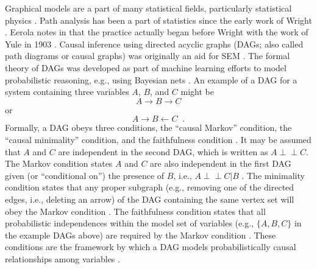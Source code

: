 \documentclass{article}[10pt]
\def\ci{\perp\!\!\!\perp}
\begin{document}
Graphical models are a part of many statistical fields, particularly statistical physics \cite{Lauritzen1996}.  Path analysis has been a part of statistics since the early work of Wright \cite{Wright1934}.  Eerola notes in \cite{Eerola2012} that the practice actually began before Wright with the work of Yule in 1903 \cite{Yule1903}.  Causal inference using directed acyclic graphs (DAGs; also called path diagrams or causal graphs) was originally an aid for SEM \cite{Greenland2002}.  The formal theory of DAGs was developed as part of machine learning efforts to model probabilistic reasoning, e.g., using Bayesian nets \cite{Spirtes2000}.  An example of a DAG for a system containing three variables $A$, $B$, and $C$ might be
\begin{equation}
A \rightarrow B \rightarrow C
\end{equation}
or
\begin{equation}
A \rightarrow B \leftarrow C\;\;.
\end{equation}
Formally, a DAG obeys three conditions, the ``causal Markov'' condition, the ``causal minimality'' condition, and the faithfulness condition \cite{Spirtes2000,Pearl2000}.  It may be assumed that $A$ and $C$ are independent in the second DAG, which is written as $A\ci C$.  The Markov condition states $A$ and $C$ are also independent in the first DAG given (or ``conditional on'') the presence of $B$, i.e., $A\ci C|B$ \cite{Spirtes2000}.  The minimality condition states that any proper subgraph (e.g., removing one of the directed edges, i.e., deleting an arrow) of the DAG containing the same vertex set will obey the Markov condition \cite{Spirtes2000,Hitchcock2012}.  The faithfulness condition states that all probabilistic independences within the model set of variables (e.g., $\{A,B,C\}$ in the example DAGs above) are required by the Markov condition \cite{Spirtes2000,Pearl2000,Hitchcock2012}.  These conditions are the framework by which a DAG models probabilistically causal relationships among variables \cite{Pearl2000}.  
\end{document}
